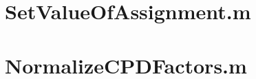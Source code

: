 \documentclass{article}
\begin{document}
\tableofcontents
\newpage
\section{SetValueOfAssignment.m}

\section{NormalizeCPDFactors.m}

\end{document}

